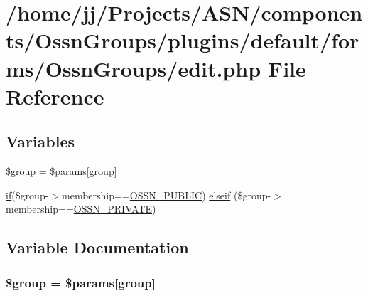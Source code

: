 \hypertarget{components_2_ossn_groups_2plugins_2default_2forms_2_ossn_groups_2edit_8php}{}\section{/home/jj/\+Projects/\+A\+S\+N/components/\+Ossn\+Groups/plugins/default/forms/\+Ossn\+Groups/edit.php File Reference}
\label{components_2_ossn_groups_2plugins_2default_2forms_2_ossn_groups_2edit_8php}
\subsection*{Variables}
\begin{DoxyCompactItemize}
\item 
\hyperlink{components_2_ossn_groups_2plugins_2default_2forms_2_ossn_groups_2edit_8php_ad530a85733b0ec1dc321859fd8faa0dc}{\$group} = \$params\mbox{[}\textquotesingle{}group\textquotesingle{}\mbox{]}
\item 
\hyperlink{jquery_8tokeninput_8js_ad8dd46a3cbc004569e34401e9e71771a}{if}(\$group-\/$>$membership==\hyperlink{ossn_8lib_8system_8php_a8efdc824fa9025d0c02ee7c512aafdfa}{O\+S\+S\+N\+\_\+\+P\+U\+B\+L\+IC}) \hyperlink{components_2_ossn_groups_2plugins_2default_2forms_2_ossn_groups_2edit_8php_a193e3a573c5e50b6f6604ac849466645}{elseif} (\$group-\/$>$membership==\hyperlink{ossn_8lib_8system_8php_a982684c5e83907832c9079348ec7edd3}{O\+S\+S\+N\+\_\+\+P\+R\+I\+V\+A\+TE})
\end{DoxyCompactItemize}


\subsection{Variable Documentation}
\subsubsection[{\texorpdfstring{\$group}{$group}}]{\setlength{\rightskip}{0pt plus 5cm}\$group = \$params\mbox{[}\textquotesingle{}group\textquotesingle{}\mbox{]}}\hypertarget{components_2_ossn_groups_2plugins_2default_2forms_2_ossn_groups_2edit_8php_ad530a85733b0ec1dc321859fd8faa0dc}{}\label{components_2_ossn_groups_2plugins_2default_2forms_2_ossn_groups_2edit_8php_ad530a85733b0ec1dc321859fd8faa0dc}


